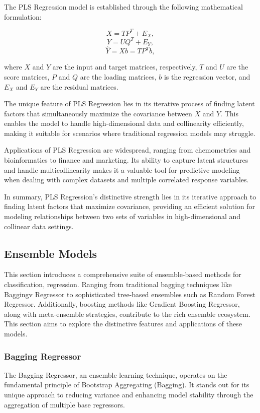 \documentclass[twocolumn]{article}
\begin{document}
The PLS Regression model is established through the following mathematical formulation:

\[ X = TP^T + E_X, \]
\[ Y = UQ^T + E_Y, \]
\[ \hat{Y} = Xb = TP^Tb, \]

where \(X\) and \(Y\) are the input and target matrices, respectively, \(T\) and \(U\) are the score matrices, \(P\) and \(Q\) are the loading matrices, \(b\) is the regression vector, and \(E_X\) and \(E_Y\) are the residual matrices.

The unique feature of PLS Regression lies in its iterative process of finding latent factors that simultaneously maximize the covariance between \(X\) and \(Y\). This enables the model to handle high-dimensional data and collinearity efficiently, making it suitable for scenarios where traditional regression models may struggle.

Applications of PLS Regression are widespread, ranging from chemometrics and bioinformatics to finance and marketing. Its ability to capture latent structures and handle multicollinearity makes it a valuable tool for predictive modeling when dealing with complex datasets and multiple correlated response variables.

In summary, PLS Regression's distinctive strength lies in its iterative approach to finding latent factors that maximize covariance, providing an efficient solution for modeling relationships between two sets of variables in high-dimensional and collinear data settings.

	\subsection{Ensemble Models}
This section introduces a comprehensive suite of ensemble-based methods for classification, regression. Ranging from traditional bagging techniques like Baggingv Regressor to sophisticated tree-based ensembles such as Random Forest Regressor. Additionally, boosting methods like Gradient Boosting Regressor, along with meta-ensemble strategies, contribute to the rich ensemble ecosystem. This section aims to explore the distinctive features and applications of these models.
		\subsubsection{Bagging Regressor}	
The Bagging Regressor, an ensemble learning technique, operates on the fundamental principle of Bootstrap Aggregating (Bagging). It stands out for its unique approach to reducing variance and enhancing model stability through the aggregation of multiple base regressors. 
\end{document}
